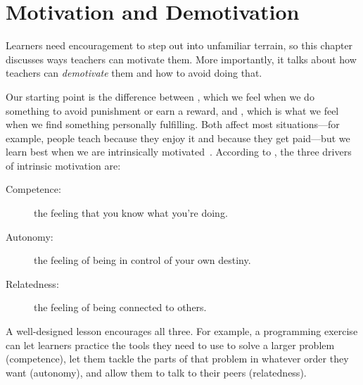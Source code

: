 \chapter{Motivation and Demotivation}\label{s:motivation}

Learners need encouragement to step out into unfamiliar terrain,
so this chapter discusses ways teachers can motivate them.
More importantly,
it talks about how teachers can \emph{demotivate} them
and how to avoid doing that.

Our starting point is the difference between
,
which we feel when we do something to avoid punishment or earn a reward,
and ,
which is what we feel when we find something personally fulfilling.
Both affect most situations---for example,
people teach because they enjoy it and because they get paid---but
we learn best when we are intrinsically motivated~\cite{Wlod2017}.
According to ,
the three drivers of intrinsic motivation are:

\begin{description}

\item[Competence:]
  the feeling that you know what you're doing.

\item[Autonomy:]
  the feeling of being in control of your own destiny.

\item[Relatedness:]
  the feeling of being connected to others.

\end{description}

A well-designed lesson encourages all three.
For example,
a programming exercise can
let learners practice the tools they need to use to solve a larger problem (competence),
let them tackle the parts of that problem in whatever order they want (autonomy),
and allow them to talk to their peers (relatedness).

